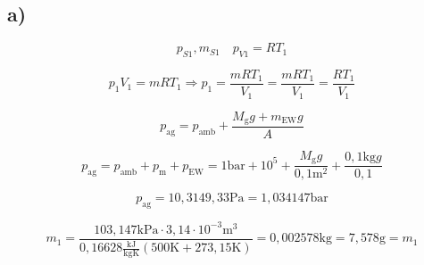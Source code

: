 

\subsection*{a)}

\[
p_{S1}, m_{S1} \quad p_{V1} = RT_1
\]

\[
p_1 V_1 = m R T_1 \Rightarrow p_1 = \frac{m R T_1}{V_1} = \frac{m R T_1}{V_1} = \frac{R T_1}{V_1}
\]

\[
p_{\text{ag}} = p_{\text{amb}} + \frac{M_{\text{g}} g + m_{\text{EW}} g}{A}
\]

\[
p_{\text{ag}} = p_{\text{amb}} + p_{\text{m}} + p_{\text{EW}} = 1 \text{bar} + 10^5 + \frac{M_{\text{g}} g}{0,1 \text{m}^2} + \frac{0,1 \text{kg} g}{0,1}
\]

\[
p_{\text{ag}} = 10,3149,33 \text{Pa} = 1,034147 \text{bar}
\]

\[
m_1 = \frac{103,147 \text{kPa} \cdot 3,14 \cdot 10^{-3} \text{m}^3}{0,16628 \frac{\text{kJ}}{\text{kgK}} (500 \text{K} + 273,15 \text{K})} = 0,002578 \text{kg} = 7,578 \text{g} = m_1
\]